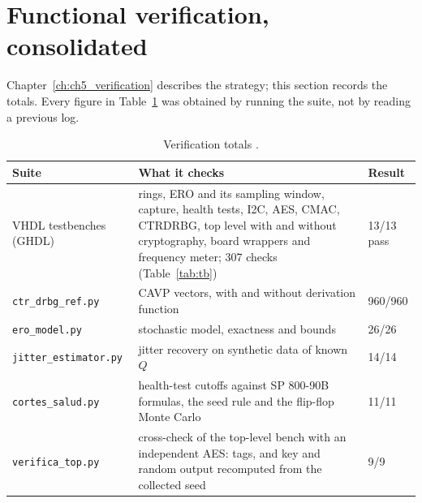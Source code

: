 \section{Functional verification, consolidated}
\label{sec:verif_results}

Chapter~\ref{ch:ch5_verification} describes the strategy; this section
records the totals. Every figure in Table~\ref{tab:verif} was obtained by
running the suite, not by reading a previous log.

\begin{table}[htbp]
\centering
\caption{Verification totals \simu{}.}
\label{tab:verif}
\small
\begin{tabular}{@{}lp{7.0cm}l@{}}
\toprule
Suite & What it checks & Result \\
\midrule
VHDL testbenches (GHDL) & rings, \ac{ERO} and its sampling window,
  capture, health tests, \ac{I2C}, \ac{AES}, \ac{CMAC}, \ac{CTRDRBG}, top
  level with and without cryptography, board wrappers and frequency
  meter; 307 checks (Table~\ref{tab:tb}) & 13/13 pass \\
\texttt{ctr\_drbg\_ref.py} & \ac{CAVP} vectors, with and without
  derivation function & 960/960 \\
\texttt{ero\_model.py} & stochastic model, exactness and bounds & 26/26 \\
\texttt{jitter\_estimator.py} & jitter recovery on synthetic data of
  known $Q$ & 14/14 \\
\texttt{cortes\_salud.py} & health-test cutoffs against SP 800-90B
  formulas, the seed rule and the flip-flop Monte Carlo & 11/11 \\
\texttt{verifica\_top.py} & cross-check of the top-level bench with an
  independent \ac{AES}: tags, and key and random output recomputed from
  the collected seed & 9/9 \\
\bottomrule
\end{tabular}
\end{table}

